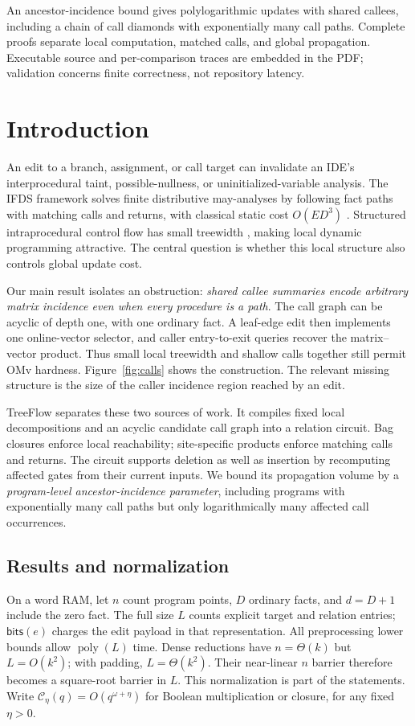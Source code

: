 \documentclass[11pt,letterpaper]{article}
\theoremstyle{definition}
\newcommand{\cost}{\mathcal C_\eta}
\newcommand{\poly}{\operatorname{poly}}
\newcommand{\bits}{\mathsf{bits}}
\begin{document}
\begin{titlepage}
An ancestor-incidence bound gives polylogarithmic updates with shared
callees, including a chain of call diamonds with exponentially many call
paths. Complete proofs separate local computation, matched calls, and
global propagation. Executable source and per-comparison traces are embedded
in the PDF; validation concerns finite correctness, not repository latency.
\end{titlepage}
\setcounter{page}{1}
\pagestyle{plain}

\section{Introduction}
An edit to a branch, assignment, or call target can invalidate an IDE's
interprocedural taint, possible-nullness, or uninitialized-variable analysis.
The IFDS framework solves finite distributive may-analyses by following fact
paths with matching calls and returns, with classical static cost $O(ED^3)$
\cite{RHS95}. Structured intraprocedural control flow has small treewidth
\cite{Thorup98}, making local dynamic programming attractive. The central
question is whether this local structure also controls global update cost.

Our main result isolates an obstruction: \emph{shared callee summaries encode
arbitrary matrix incidence even when every procedure is a path}. The call
graph can be acyclic of depth one, with one ordinary fact. A leaf-edge edit
then implements one online-vector selector, and caller entry-to-exit queries
recover the matrix--vector product. Thus small local treewidth and shallow
calls together still permit OMv hardness. Figure~\ref{fig:calls} shows the
construction. The relevant missing structure is the size of the caller
incidence region reached by an edit.

TreeFlow separates these two sources of work. It compiles fixed local
decompositions and an acyclic candidate call graph into a relation circuit.
Bag closures enforce local reachability; site-specific products enforce
matching calls and returns. The circuit supports deletion as well as
insertion by recomputing affected gates from their current inputs. We bound
its propagation volume by a \emph{program-level ancestor-incidence parameter},
including programs with exponentially many call paths but only logarithmically
many affected call occurrences.

\subsection{Results and normalization}
On a word RAM, let $n$ count program points, $D$ ordinary facts, and
$d=D+1$ include the zero fact. The full size $L$ counts explicit target
and relation entries; $\bits(e)$ charges the edit payload in that representation. All preprocessing lower bounds allow $\poly(L)$
time. Dense reductions have $n=\Theta(k)$ but $L=O(k^2)$; with padding,
$L=\Theta(k^2)$. Their near-linear $n$ barrier therefore becomes a
square-root barrier in $L$. This normalization is part of the statements.
Write $\cost(q)=O(q^{\omega+\eta})$ for Boolean multiplication or closure,
for any fixed $\eta>0$.
\end{document}
